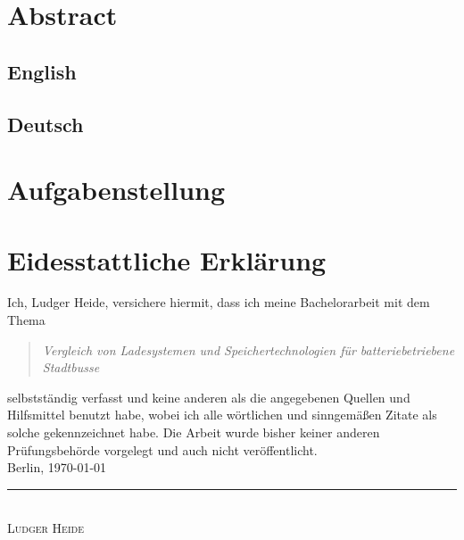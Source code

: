 \documentclass{scrreprt}
\begin{document}
\chapter*{Abstract}
\section*{English}
\section*{Deutsch}

\chapter*{Aufgabenstellung}

\chapter*{Eidesstattliche Erklärung}
Ich, Ludger Heide, versichere hiermit, dass ich meine Bachelorarbeit mit dem Thema
\begin{quote}
	\emph{Vergleich von Ladesystemen und Speichertechnologien für batteriebetriebene Stadtbusse}
\end{quote}
selbstständig verfasst und keine anderen als die angegebenen Quellen und Hilfsmittel benutzt habe, wobei ich alle wörtlichen und sinngemäßen Zitate als solche gekennzeichnet habe. Die Arbeit wurde bisher keiner anderen Prüfungsbehörde vorgelegt und auch nicht veröffentlicht.\\[6ex]
Berlin, \today\\
\newline
\rule{4cm}{0.5pt}\\
\textsc{Ludger Heide} 

\tableofcontents

\listoffigures
{}

\listoftables
{}
\newpage










 
\end{document}

